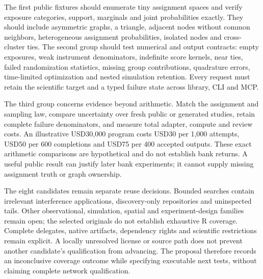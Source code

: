 The first public fixtures should enumerate tiny assignment spaces and verify exposure categories, support, marginals and joint probabilities exactly. They should include asymmetric graphs, a triangle, adjacent nodes without common neighbors, heterogeneous assignment probabilities, isolated nodes and cross-cluster ties. The second group should test numerical and output contracts: empty exposures, weak instrument denominators, indefinite score kernels, near ties, failed randomization statistics, missing group contributions, quadrature errors, time-limited optimization and nested simulation retention. Every request must retain the scientific target and a typed failure state across library, CLI and MCP.\citep{exec25_rnet_choice}

The third group concerns evidence beyond arithmetic. Match the assignment and sampling law, compare uncertainty over fresh public or generated studies, retain complete failure denominators, and measure total adapter, compute and review costs. An illustrative USD30,000 program costs USD30 per 1,000 attempts, USD50 per 600 completions and USD75 per 400 accepted outputs. These exact arithmetic comparisons are hypothetical and do not establish bank returns. A useful public result can justify later bank experiments; it cannot supply missing assignment truth or graph ownership.\citep{exec25_rnet_choice}

The eight candidates remain separate reuse decisions. Bounded searches contain irrelevant interference applications, discovery-only repositories and uninspected tails. Other observational, simulation, spatial and experiment-design families remain open; the selected originals do not establish exhaustive R coverage. Complete delegates, native artifacts, dependency rights and scientific restrictions remain explicit. A locally unresolved license or source path does not prevent another candidate's qualification from advancing. The proposal therefore records an inconclusive coverage outcome while specifying executable next tests, without claiming complete network qualification.\citep{exec25_rnet_choice}
